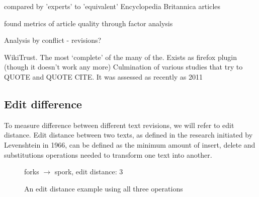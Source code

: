 \documentclass[a4paper,11pt,twoside,notitlepage]{article}
\newcommand\CellText[2]{%
          \node[texto,left=of mat#1,anchor=east]
          at (mat#1.west)
          {\large #2};
        }
\newcommand\SlText[2]{%
          \node[texto,left=of mat#1,anchor=west,rotate=50]
          at ([xshift=1.5ex,yshift=1ex]mat#1.north)
          {\large #2};
        }
\begin{document}
        compared by 'experts' to 'equivalent' Encyclopedia Britannica articles \cite{Giles2005}

        found metrics of article quality through factor analysis
        \cite{Stvilia2005}

        Analysis by conflict - revisions?\cite{Kittur2007}

        WikiTrust. The most `complete' of the many of the. Exists as
        firefox plugin (though it doesn't work any more) Culmination
        of various studies that try to QUOTE \cite{Adler2007} and QUOTE CITE. It
        was assessed as recently as 2011 \cite{Lucassen2011}
       
        \subsection{Edit difference}
        To measure difference between different text revisions, we
        will refer to edit distance. Edit distance between two texts,
        as defined in the research initiated by Levenshtein in
        1966,\cite{Levenshtein1966} can be defined as the minimum
        amount of insert, delete and substitutions operations needed
        to transform one text into another.

        \begin{figure}[h]
          \centering
                  

          \vspace{3 mm}

          forks $\rightarrow$ spork, edit distance: 3
          
          \caption{An edit distance example using all three operations}
          \label{fig:fork-spork}
        \end{figure}
\end{document}
